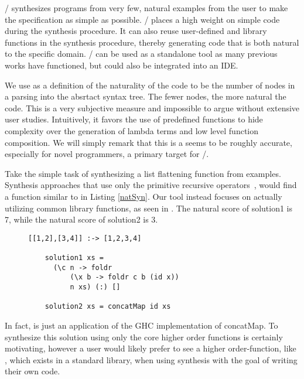\ourTool/ synthesizes programs from very few, natural examples from the user to make the specification as simple as possible.
\ourTool/ places a high weight on simple code during the synthesis procedure.
It can also reuse user-defined and library functions in the synthesis procedure, thereby generating code that is both natural to the specific domain.
\ourTool/ can be used as a standalone tool as many previous works have functioned, but could also be integrated into an IDE.

We use as a definition of the naturality of the code to be the number of nodes in a parsing into the absrtact syntax tree.
The fewer nodes, the more natural the code.
This is a very subjective measure and impossible to argue without extensive user studies.
Intuitively, it favors the use of predefined functions to hide complexity over the generation of lambda terms and low level function composition.
We will simply remark that this is a seems to be roughly accurate, especially for novel programmers, a primary target for \ourTool/.

Take the simple task of synthesizing a list flattening function from examples.
Synthesis approaches that use only the primitive recursive operators~\cite{Osera:2015,FeserCD15}, would find a function similar to  in Listing \ref{natSyn}.
Our tool instead focuses on actually utilizing common library functions, as seen in .
The natural score of solution1 is 7, while the natural score of solution2 is 3.

\begin{figure}
  \begin{lstlisting}[caption=Low-level synthesis vs. Natural synthesis,label=natSyn]
    [[1,2],[3,4]] :-> [1,2,3,4]

    solution1 xs =
      (\c n -> foldr
          (\x b -> foldr c b (id x))
          n xs) (:) []

    solution2 xs = concatMap id xs
    \end{lstlisting}
\end{figure}

\noindent In fact,  is just an application of the GHC\cite{ghc} implementation of concatMap.
To synthesize this solution using only the core higher order functions is certainly motivating, however a user would likely prefer to see a higher order-function, like , which exists in a standard library, when using synthesis with the goal of writing their own code.

